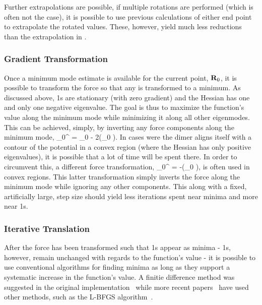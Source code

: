 Further extrapolations are possible, if multiple rotations are performed (which is often not the case), it is possible to use previous calculations of either end point to extrapolate the rotated values.
These, however, yield much less reductions than the extrapolation in .

\recent

\subsubsection{Gradient Transformation}
Once a minimum mode estimate is available for the current point, ${\mathrm{\mathbf{\bm{R}}}}_0$, it is possible to transform the force so that any  is transformed to a minimum.
As discussed above, \sap1s are stationary (with zero gradient) and the Hessian has one and only one negative eigenvalue.
The goal is thus to maximize the function's value along the minimum mode while minimizing it along all other eigenmodes.
This can be achieved, simply, by inverting any force components along the minimum mode,
\vF_0^ = \vF_0 - 2(\vF_0 \cdot \uvn)\uvn.
\eeq
In cases were the dimer aligns itself with a contour of the potential in a convex region (where the Hessian has only positive eigenvalues), it is possible that a lot of time will be spent there.
In order to circumvent this, a different force transformation,
\vF_0^ = -(\vF_0 \cdot \uvn)\uvn ,
\eeq
is often used in convex regions.
This latter transformation simply inverts the force along the minimum mode while ignoring any other components.
This along with a fixed, artificially large, step size should yield less iterations spent near minima and more near \sap1s.~\cite{dimer-original-1999}

\recent

\subsubsection{Iterative Translation}
After the force has been transformed such that \sap1s appear as minima - \sap1s, however, remain unchanged with regards to the function's value - it is possible to use conventional algorithms for finding minima as long as they support a systematic increase in the function's value.
A finitie difference method was suggested in the original implementation~\cite{dimer-original-1999} while more recent papers~\cite{dimer-kastner-2008} have used other methods, such as the L-BFGS algorithm~\cite{lbfgs}.

\recent

